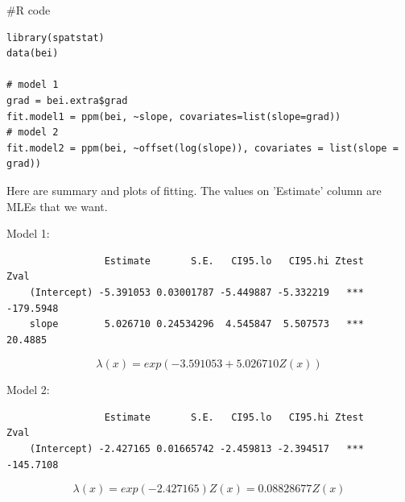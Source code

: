 \documentclass{article}
\newenvironment{Rcode}%
{%
    \begin{mdframed}
    \#R code
    \begin{small}
}
{%
    \end{small}
    \end{mdframed}
}
\begin{document}
\begin{Rcode}
    \begin{verbatim}
library(spatstat)
data(bei)

# model 1
grad = bei.extra$grad
fit.model1 = ppm(bei, ~slope, covariates=list(slope=grad))
# model 2
fit.model2 = ppm(bei, ~offset(log(slope)), covariates = list(slope = grad))
    \end{verbatim}
\end{Rcode}

Here are summary and plots of fitting.
The values on 'Estimate' column are MLEs that we want.

Model 1:
\begin{verbatim}
                 Estimate       S.E.   CI95.lo   CI95.hi Ztest      Zval
    (Intercept) -5.391053 0.03001787 -5.449887 -5.332219   *** -179.5948
    slope        5.026710 0.24534296  4.545847  5.507573   ***   20.4885
\end{verbatim}
\[\lambda(x) = exp(-3.591053 + 5.026710 Z(x))\]

Model 2:
\begin{verbatim}
                 Estimate       S.E.   CI95.lo   CI95.hi Ztest      Zval
    (Intercept) -2.427165 0.01665742 -2.459813 -2.394517   *** -145.7108
\end{verbatim}
\[\lambda(x) = exp(-2.427165) Z(x) =  0.08828677 Z(x)\]
\end{document}
